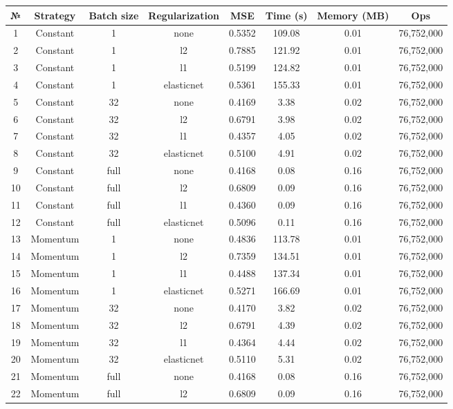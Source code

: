 \documentclass{article}
\begin{document}
\begin{table}[htbp]
\centering
\scriptsize
\begin{tabular}{|c|c|c|c|c|c|c|c|}
\hline
\textbf{№} & \textbf{Strategy} & \textbf{Batch size} & \textbf{Regularization} & \textbf{MSE} & \textbf{Time (s)} & \textbf{Memory (MB)} & \textbf{Ops} \\
\hline
1 & Constant & 1 & none & 0.5352 & 109.08 & 0.01 & 76,752,000 \\
2 & Constant & 1 & l2 & 0.7885 & 121.92 & 0.01 & 76,752,000 \\
3 & Constant & 1 & l1 & 0.5199 & 124.82 & 0.01 & 76,752,000 \\
4 & Constant & 1 & elasticnet & 0.5361 & 155.33 & 0.01 & 76,752,000 \\
5 & Constant & 32 & none & 0.4169 & 3.38 & 0.02 & 76,752,000 \\
6 & Constant & 32 & l2 & 0.6791 & 3.98 & 0.02 & 76,752,000 \\
7 & Constant & 32 & l1 & 0.4357 & 4.05 & 0.02 & 76,752,000 \\
8 & Constant & 32 & elasticnet & 0.5100 & 4.91 & 0.02 & 76,752,000 \\
9 & Constant & full & none & 0.4168 & 0.08 & 0.16 & 76,752,000 \\
10 & Constant & full & l2 & 0.6809 & 0.09 & 0.16 & 76,752,000 \\
11 & Constant & full & l1 & 0.4360 & 0.09 & 0.16 & 76,752,000 \\
12 & Constant & full & elasticnet & 0.5096 & 0.11 & 0.16 & 76,752,000 \\
\hline
13 & Momentum & 1 & none & 0.4836 & 113.78 & 0.01 & 76,752,000 \\
14 & Momentum & 1 & l2 & 0.7359 & 134.51 & 0.01 & 76,752,000 \\
15 & Momentum & 1 & l1 & 0.4488 & 137.34 & 0.01 & 76,752,000 \\
16 & Momentum & 1 & elasticnet & 0.5271 & 166.69 & 0.01 & 76,752,000 \\
17 & Momentum & 32 & none & 0.4170 & 3.82 & 0.02 & 76,752,000 \\
18 & Momentum & 32 & l2 & 0.6791 & 4.39 & 0.02 & 76,752,000 \\
19 & Momentum & 32 & l1 & 0.4364 & 4.44 & 0.02 & 76,752,000 \\
20 & Momentum & 32 & elasticnet & 0.5110 & 5.31 & 0.02 & 76,752,000 \\
21 & Momentum & full & none & 0.4168 & 0.08 & 0.16 & 76,752,000 \\
22 & Momentum & full & l2 & 0.6809 & 0.09 & 0.16 & 76,752,000 \\

\end{tabular}
\end{table}
\end{document}
